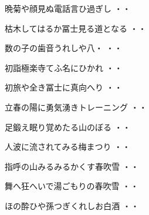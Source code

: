 \begin{shiika}晩菊や顔見ぬ電話言ひ過ぎし
\hfill{・・}\end{shiika}
\vspace{0.6cm}
\begin{shiika}枯木してはるか冨士見る道となる
\hfill{・・}\end{shiika}
\vspace{0.6cm}
\begin{shiika}数の子の歯音うれしや八・
\hfill{・・}\end{shiika}
\vspace{0.6cm}
\begin{shiika}初詣極楽寺てふ名にひかれ
\hfill{・・}\end{shiika}
\vspace{0.6cm}
\begin{shiika}初旅や全き冨士に真向へり
\hfill{・・}\end{shiika}
\vspace{0.6cm}
\begin{shiika}立春の陽に勇気湧きトレーニング
\hfill{・・}\end{shiika}
\vspace{0.6cm}
\begin{shiika}足鍛え眠り覚めたる山のぼる
\hfill{・・}\end{shiika}
\vspace{0.6cm}
\begin{shiika}人波に流されてみる梅まつり
\hfill{・・}\end{shiika}
\vspace{0.6cm}
\begin{shiika}指呼の山みるみるかくす春吹雪
\hfill{・・}\end{shiika}
\vspace{0.6cm}
\begin{shiika}舞へ狂へいで湯ごもりの春吹雪
\hfill{・・}\end{shiika}
\vspace{0.6cm}
\begin{shiika}ほの酔ひや孫つぎくれしお白酒
\hfill{・・}\end{shiika}
\vspace{0.6cm}
